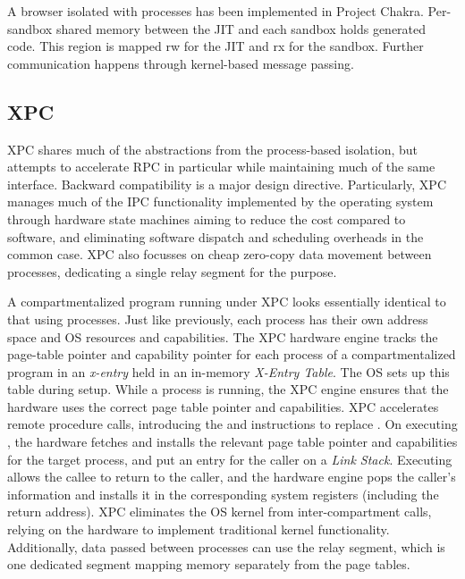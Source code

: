 A browser isolated with processes has been implemented in Project Chakra.
Per-sandbox shared memory between the JIT and each sandbox holds generated
code. 
This region is mapped rw for the JIT and rx for the sandbox.
Further communication happens through kernel-based message passing.


\subsection{XPC}

XPC shares much of the abstractions from the process-based isolation, but
attempts to accelerate RPC in particular while maintaining much of the same
interface.
Backward compatibility is a major design directive.
Particularly, XPC manages much of the IPC functionality implemented by the
operating system through hardware state machines aiming to reduce the cost
compared to software, and eliminating software dispatch and scheduling 
overheads in the common case.
XPC also focusses on cheap zero-copy data movement between processes,
dedicating a single relay segment for the purpose.

A compartmentalized program running under XPC looks essentially identical
to that using processes.
Just like previously, each process has their own address space and OS 
resources and capabilities.
The XPC hardware engine tracks the page-table pointer and capability pointer
for each process of a compartmentalized program in an \emph{x-entry} held in
an in-memory \emph{X-Entry Table}.
The OS sets up this table during setup.
While a process is running, the XPC engine ensures that the hardware uses the
correct page table pointer and capabilities.
XPC accelerates remote procedure calls, introducing the  and
 instructions to replace .
On executing , the hardware fetches and installs the relevant 
page table pointer and capabilities for the target process, 
and put an entry for the caller on a \emph{Link Stack}.
Executing  allows the callee to return to the caller, and the
hardware engine pops the caller's information and installs it in the
corresponding system registers (including the return address). 
XPC eliminates the OS kernel from inter-compartment calls, relying on the 
hardware to implement traditional kernel functionality.
Additionally, data passed between processes can use the relay segment, which
is one dedicated segment mapping memory separately from the page tables.

